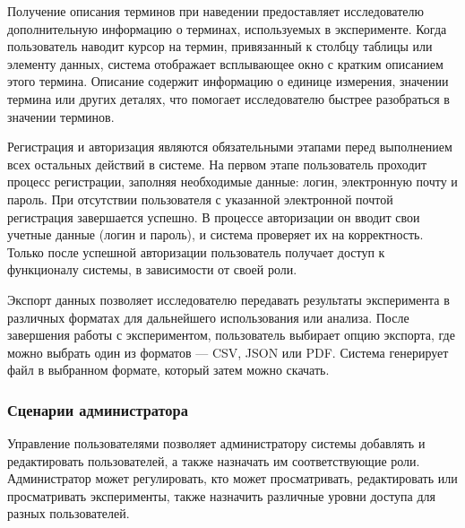 Получение описания терминов при наведении предоставляет исследователю дополнительную информацию о терминах, используемых в эксперименте. Когда пользователь наводит курсор на термин, привязанный к столбцу таблицы или элементу данных, система отображает всплывающее окно с кратким описанием этого термина. Описание содержит информацию о единице измерения, значении термина или других деталях, что помогает исследователю быстрее разобраться в значении терминов.

Регистрация и авторизация являются обязательными этапами перед выполнением всех остальных действий в системе. На первом этапе пользователь проходит процесс регистрации, заполняя необходимые данные: логин, электронную почту и пароль. При отсутствии пользователя с указанной электронной почтой регистрация завершается успешно. В процессе авторизации он вводит свои учетные данные (логин и пароль), и система проверяет их на корректность. Только после успешной авторизации пользователь получает доступ к функционалу системы, в зависимости от своей роли.

Экспорт данных позволяет исследователю передавать результаты эксперимента в различных форматах для дальнейшего использования или анализа. После завершения работы с экспериментом, пользователь выбирает опцию экспорта, где можно выбрать один из форматов — CSV, JSON или PDF. Система генерирует файл в выбранном формате, который затем можно скачать.

\subsubsection{Сценарии администратора}

Управление пользователями позволяет администратору системы добавлять и редактировать пользователей, а также назначать им соответствующие роли. Администратор может регулировать, кто может просматривать, редактировать или просматривать эксперименты, также назначить различные уровни доступа для разных пользователей.

